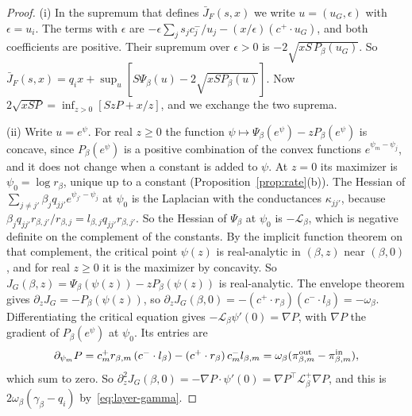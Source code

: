 \begin{proof}
(i) In the supremum that defines $\bar J_F(s,x)$ we write $u=(u_G,\epsilon)$ with
$\epsilon=u_i$. The terms with $\epsilon$ are
$-\epsilon\sum_js_jc^-_j/u_j-(x/\epsilon)(c^+\cdot u_G)$, and both coefficients are positive.
Their supremum over $\epsilon>0$ is $-2\sqrt{xS\,P_\beta(u_G)}$. So
$\bar J_F(s,x)=q_ix+\sup_u[S\Psi_\beta(u)-2\sqrt{xSP_\beta(u)}]$. Now
$2\sqrt{xSP}=\inf_{z>0}[SzP+x/z]$, and we exchange the two suprema.

(ii) Write $u=e^\psi$. For real $z\ge0$ the function $\psi\mapsto\Psi_\beta(e^\psi)-zP_\beta(e^\psi)$
is concave, since $P_\beta(e^\psi)$ is a positive combination of the convex functions
$e^{\psi_m-\psi_j}$, and it does not change when a constant is added to $\psi$. At $z=0$ its
maximizer is $\psi_0=\log r_\beta$, unique up to a constant (Proposition~\ref{prop:rate}(b)).
The Hessian of $\sum_{j\ne j'}\beta_jq_{jj'}e^{\psi_{j'}-\psi_j}$ at $\psi_0$ is the Laplacian
with the conductances $\kappa_{jj'}$, because $\beta_jq_{jj'}r_{\beta,j'}/r_{\beta,j}=l_{\beta,j}q_{jj'}r_{\beta,j'}$.
So the Hessian of $\Psi_\beta$ at $\psi_0$ is $-\mathcal L_\beta$, which is negative definite on
the complement of the constants. By the implicit function theorem on that complement, the
critical point $\psi(z)$ is real-analytic in $(\beta,z)$ near $(\beta,0)$, and for real $z\ge0$
it is the maximizer by concavity. So $J_G(\beta,z)=\Psi_\beta(\psi(z))-zP_\beta(\psi(z))$ is
real-analytic. The envelope theorem gives $\partial_zJ_G=-P_\beta(\psi(z))$, so
$\partial_zJ_G(\beta,0)=-(c^+\cdot r_\beta)(c^-\cdot l_\beta)=-\omega_\beta$. Differentiating the
critical equation gives $-\mathcal L_\beta\psi'(0)=\nabla P$, with $\nabla P$ the gradient of
$P_\beta(e^\psi)$ at $\psi_0$. Its entries are
\[
\partial_{\psi_m}P=c^+_mr_{\beta,m}\,(c^-\cdot l_\beta)-(c^+\cdot r_\beta)\,c^-_ml_{\beta,m}=\omega_\beta(\pi^{\rm out}_{\beta,m}-\pi^{\rm in}_{\beta,m}),
\]
which sum to zero. So $\partial_z^2J_G(\beta,0)=-\nabla P\cdot\psi'(0)=\nabla P^\top\mathcal L_\beta^+\nabla P$,
and this is $2\omega_\beta(\gamma_\beta-q_i)$ by~\eqref{eq:layer-gamma}.


\end{proof}
